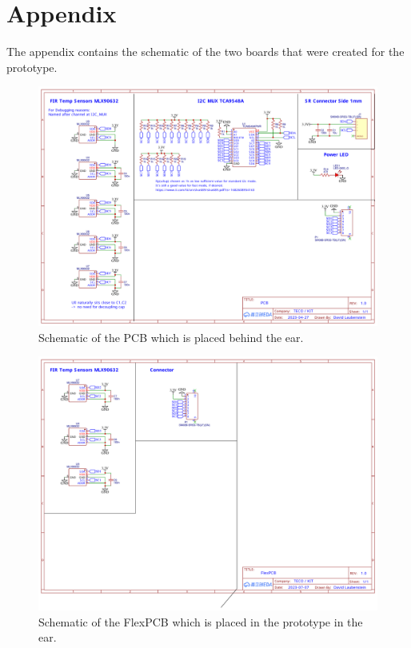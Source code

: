 \chapter{Appendix}
\label{ch:appendix}
The appendix contains the schematic of the two boards that were created for the prototype. 

\begin{figure}
    \centering
    \includegraphics[width=\textwidth]{thesis-doc/images/prototype/schematic/Schematic_Open Earable 1.3 - I2C PCB David_2023-10-17.pdf}
    \caption{Schematic of the PCB which is placed behind the ear.}    
    \label{fig:appendix:schematic_pcb}
\end{figure} 

\begin{figure}
    \centering
    \includegraphics[width=\textwidth]{thesis-doc/images/prototype/schematic/Schematic_Open Earable 1.3 - I2C FlexPCB David_2023-10-17.pdf}
    \caption{Schematic of the FlexPCB which is placed in the prototype in the ear.}    
    \label{fig:appendix:schematic_pcb}
\end{figure} 